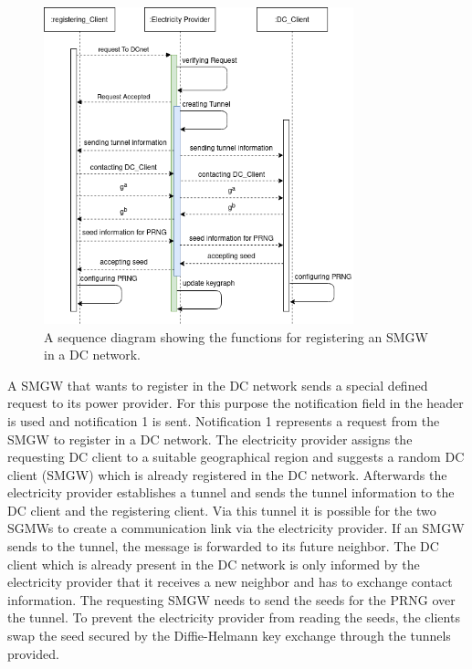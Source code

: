 \begin{figure}[tbp]
  \centering
  \includegraphics[width=0.8\textwidth]{images/Registering2.png}
  \caption[Sequence Diagram Registering]{
A sequence diagram showing the functions for registering an SMGW in a DC network.}
  \label{fig:sequencediagramregistering}
\end{figure}
A SMGW that wants to register in the DC network sends a special defined request to its power provider. For this purpose the notification field in the header is used and notification 1 is sent. Notification 1 represents a request from the SMGW to register in a DC network. The electricity provider assigns the requesting DC client to a suitable geographical region and suggests a random DC client (SMGW) which is already registered in the DC network. Afterwards the electricity provider establishes a tunnel and sends the tunnel information to the DC client and the registering client. Via this tunnel it is possible for the two SGMWs to create a communication link via the electricity provider. If an SMGW sends to the tunnel, the message is forwarded to its future neighbor. The DC client which is already present in the DC network is only informed by the electricity provider that it receives a new neighbor and has to exchange contact information. The requesting SMGW needs to send the seeds for the PRNG over the tunnel. To prevent the electricity provider from reading the seeds, the clients swap the seed secured by the Diffie-Helmann key exchange through the tunnels provided.\\%
